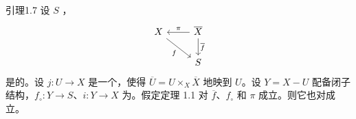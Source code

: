 \begin{SGAresult}{引理}{1.7}
设 $S$ ，
\[
\begin{tikzcd}
X\arrow[dr,"f"']&\overline X\arrow[l,"\pi"']\arrow[d,"\overline f"]\\
&S
\end{tikzcd}
\]
是的。设 $j:U\to X$ 是一个，使得 $\overline U=U\times_X\overline X$ 地映到 $U$。设 $Y=X-U$ 配备闭子结构，$f_\circ:Y\to S$、$i:Y\to X$ 为。假定定理 1.1 对 $\overline f$、$f_\circ$ 和 $\pi$ 成立。则它也对成立。
\end{SGAresult}
